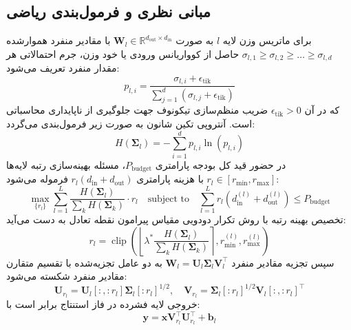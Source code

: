 \subsection{مبانی نظری و فرمول‌بندی ریاضی}
برای ماتریس وزن لایه $l$ به صورت $\mathbf{W}_l \in \mathbb{R}^{d_{\text{out}} \times d_{\text{in}}}$ با مقادیر منفرد هموارشده $\sigma_{l, 1} \ge \sigma_{l, 2} \ge \dots \ge \sigma_{l, d}$ حاصل از کوواریانس ورودی یا خود وزن، جرم احتمالاتی هر مقدار منفرد تعریف می‌شود:
\begin{equation}
p_{l, i} = \frac{\sigma_{l, i} + \epsilon_{\text{tik}}}{\sum_{j=1}^d (\sigma_{l, j} + \epsilon_{\text{tik}})}
\end{equation}
که در آن $\epsilon_{\text{tik}} > 0$ ضریب منظم‌سازی تیکونوف جهت جلوگیری از ناپایداری محاسباتی است. آنتروپی تکین شانون به صورت زیر فرمول‌بندی می‌گردد:
\begin{equation}
H(\mathbf{\Sigma}_l) = -\sum_{i=1}^d p_{l, i} \ln(p_{l, i})
\end{equation}
در حضور قید کل بودجه پارامتری $P_{\text{budget}}$، مسئله بهینه‌سازی رتبه لایه‌ها $r_l \in [r_{\min}, r_{\max}]$ با هزینه پارامتری $r_l (d_{\text{in}} + d_{\text{out}})$ فرموله می‌شود:
\begin{equation}
\max_{\{r_l\}} \sum_{l=1}^L \frac{H(\mathbf{\Sigma}_l)}{\sum_k H(\mathbf{\Sigma}_k)} \cdot r_l \quad \text{subject to} \quad \sum_{l=1}^L r_l (d_{\text{in}}^{(l)} + d_{\text{out}}^{(l)}) \le P_{\text{budget}}
\end{equation}
تخصیص بهینه رتبه با روش تکرار دودویی مقیاس پیرامون نقطه تعادل به دست می‌آید:
\begin{equation}
r_l = \operatorname{clip}\left(\left\lfloor \lambda^* \frac{H(\mathbf{\Sigma}_l)}{\sum_k H(\mathbf{\Sigma}_k)} \right\rceil, r_{\min}^{(l)}, r_{\max}^{(l)}\right)
\end{equation}
سپس تجزیه مقادیر منفرد $\mathbf{W}_l = \mathbf{U}_l \mathbf{\Sigma}_l \mathbf{V}_l^\top$ به دو عامل تجزیه‌شده با تقسیم متقارن مقادیر منفرد شکسته می‌شود:
\begin{equation}
\mathbf{U}_{r_l} = \mathbf{U}_l[:, :r_l] \mathbf{\Sigma}_l[:r_l]^{1/2}, \quad \mathbf{V}_{r_l} = \mathbf{\Sigma}_l[:r_l]^{1/2} \mathbf{V}_l[:, :r_l]^\top
\end{equation}
خروجی لایه فشرده در فاز استنتاج برابر است با:
\begin{equation}
\mathbf{y} = \mathbf{x} \mathbf{V}_{r_l}^\top \mathbf{U}_{r_l}^\top + \mathbf{b}_l
\end{equation}

